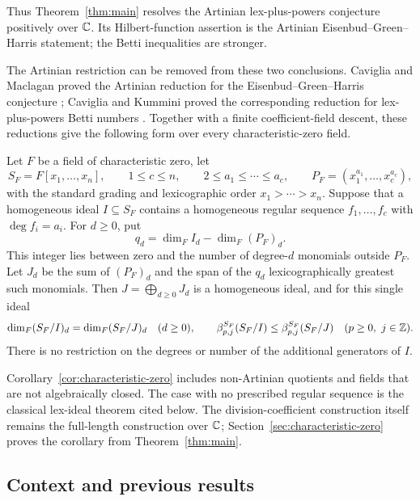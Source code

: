 Thus Theorem~\ref{thm:main} resolves the Artinian lex-plus-powers
conjecture positively over \(\mathbb C\).
Its Hilbert-function assertion is the Artinian Eisenbud--Green--Harris
statement; the Betti inequalities are stronger.

The Artinian restriction can be removed from these two conclusions.
Caviglia and Maclagan proved the Artinian reduction for the
Eisenbud--Green--Harris conjecture \cite[Proposition~10]{CM08};
Caviglia and Kummini proved the corresponding reduction for
lex-plus-powers Betti numbers \cite[Section~4, Theorem~4.1]{CK14}.
Together with a finite coefficient-field descent, these reductions give
the following form over every characteristic-zero field.

\begin{corollary}
\label{cor:characteristic-zero}
Let \(F\) be a field of characteristic zero, let
\[
 S_F=F[x_1,\ldots,x_n],\qquad
 1\le c\le n,\qquad 2\le a_1\le\cdots\le a_c,
 \qquad P_F=(x_1^{a_1},\ldots,x_c^{a_c}),
\]
with the standard grading and lexicographic order \(x_1>\cdots>x_n\).
Suppose that a homogeneous ideal \(I\subseteq S_F\) contains a homogeneous
regular sequence \(f_1,\ldots,f_c\) with \(\deg f_i=a_i\).
For \(d\ge0\), put
\[
 q_d=\dim_F I_d-\dim_F(P_F)_d.
\]
This integer lies between zero and the number of degree-\(d\) monomials
outside \(P_F\). Let \(J_d\) be the sum of \((P_F)_d\) and the span of the
\(q_d\) lexicographically greatest such monomials. Then
\(J=\bigoplus_{d\ge0}J_d\) is a homogeneous ideal, and for this single ideal
\[
 \dim_F(S_F/I)_d=\dim_F(S_F/J)_d\quad(d\ge0),\qquad
 \beta^{S_F}_{p,j}(S_F/I)\le\beta^{S_F}_{p,j}(S_F/J)
 \quad(p\ge0,\ j\in\mathbb Z).
\]
There is no restriction on the degrees or number of the additional
generators of \(I\).
\end{corollary}

Corollary~\ref{cor:characteristic-zero} includes non-Artinian quotients
and fields that are not algebraically closed. The case with no prescribed
regular sequence is the classical lex-ideal theorem cited below.
The division-coefficient construction itself remains the full-length
construction over \(\mathbb C\); Section~\ref{sec:characteristic-zero} proves
the corollary from Theorem~\ref{thm:main}.

\subsection{Context and previous results}

